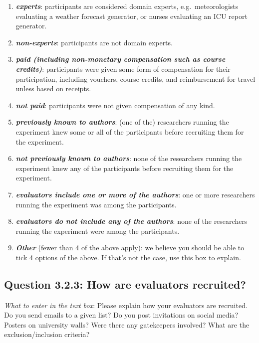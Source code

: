 \documentclass[11pt,a4paper]{article}
\newcommand{\egcvalue}[1]{\textbf{\textit{#1}}}
\begin{document}
\begin{enumerate}[itemsep=0cm,leftmargin=0.5cm,label={\small $\square$}]
    \item \egcvalue{experts}: participants are considered domain experts, e.g.\ meteorologists evaluating a weather forecast generator, or nurses evaluating an ICU report generator.
    \item \egcvalue{non-experts}: participants are not domain experts.
    \item \egcvalue{paid (including non-monetary compensation such as course credits)}: participants were given some form of compensation for their participation, including vouchers, course credits, and reimbursement for travel unless based on receipts.
    \item \egcvalue{not paid}: participants were not given compensation of any kind.
    \item \egcvalue{previously known to authors}: (one of the) researchers running the experiment knew some or all of the participants before recruiting them for the experiment.
    \item \egcvalue{not previously known to authors}: none of the researchers running the experiment knew any of the participants before recruiting them for the experiment.
    \item \egcvalue{evaluators include one or more of the authors}: one or more researchers running the experiment was among the participants.
    \item \egcvalue{evaluators do not include any of the authors}: none of the researchers running the experiment were among the participants.
    \item \egcvalue{Other} (fewer than 4 of the above apply): we believe you should be able to tick 4 options of the above. If that's not the case, use this box to explain.
\end{enumerate}

\vspace{-.3cm}
\subsection*{Question 3.2.3:  How are evaluators recruited?}

\noindent\textit{What to enter in the text box}: Please explain how your evaluators are recruited. Do you send emails to a given list? Do you post invitations on social media? Posters on university walls? Were there any gatekeepers involved? What are the exclusion/inclusion criteria? 
\end{document}
